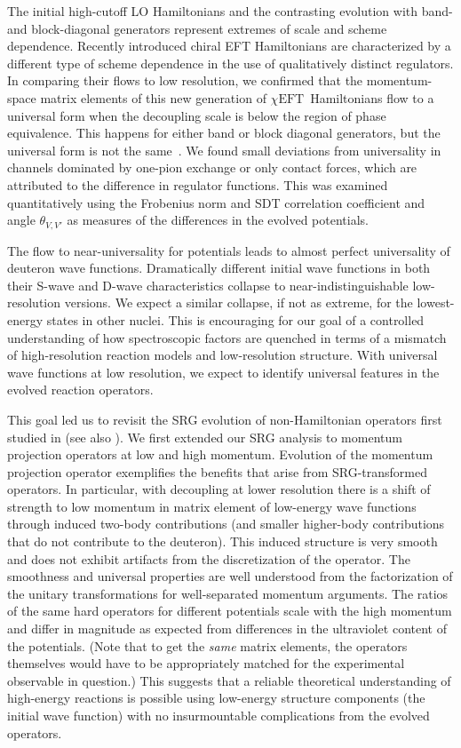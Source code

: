 \documentclass[10pt,aps,prc,floatfix,twocolumn,nofootinbib]{revtex4-1}
\newcommand{\chiEFT}{\ensuremath{\chi{\textrm{EFT}}}}
\begin{document}
The initial high-cutoff LO Hamiltonians and the contrasting evolution with band- and block-diagonal generators represent extremes of scale and scheme dependence.
Recently introduced chiral EFT Hamiltonians are characterized by a different type of scheme dependence in the use of qualitatively distinct regulators. 
In comparing their flows to low resolution, we confirmed that the momentum-space matrix elements of this new generation of \chiEFT\ Hamiltonians flow to a universal form when the decoupling scale is below the region of phase equivalence.
This happens for either band or block diagonal generators, but the universal form is not the same~\cite{Dainton:2013axa}.
We found small deviations from universality in channels dominated by one-pion exchange or only contact forces, which are attributed to the difference in regulator functions.
This was examined quantitatively using the Frobenius norm and SDT correlation coefficient and angle $\theta_{V,V'}$ as measures of the differences in the evolved potentials.


The flow to near-universality for potentials leads to almost perfect universality of deuteron wave functions.
Dramatically different initial wave functions in both their S-wave and D-wave characteristics collapse to near-indistinguishable low-resolution versions. 
We expect a similar collapse, if not as extreme, for the lowest-energy states in other nuclei.
This is encouraging for our goal of a controlled understanding of how spectroscopic factors are quenched in terms of a mismatch of high-resolution reaction models and low-resolution structure.
With universal wave functions at low resolution, we expect to identify universal features in the evolved reaction operators.


This goal led us to revisit the SRG evolution of non-Hamiltonian operators first studied in \cite{Anderson:2010aq,Bogner:2012zm} (see also \cite{Schuster:2013sda,Schuster:2014lga}).
We first extended our SRG analysis to momentum projection operators at low and high momentum.
Evolution of the momentum projection operator exemplifies the benefits that arise from SRG-transformed operators.
In particular, with decoupling at lower resolution there is a shift of strength to low momentum in matrix element of low-energy wave functions through induced two-body contributions (and smaller higher-body contributions that do not contribute to the deuteron).
This induced structure is very smooth and does not exhibit artifacts from the discretization of the operator.
The smoothness and universal properties are well understood from the factorization of the unitary transformations for well-separated momentum arguments.
The ratios of the same hard operators for different potentials scale with the high momentum and differ in magnitude as expected from differences in the ultraviolet content of the potentials.
(Note that to get the \emph{same} matrix elements, the operators themselves would have to be appropriately matched for the experimental observable in question.)
This suggests that a reliable theoretical understanding of high-energy reactions is possible using low-energy structure components (the initial wave function) with no insurmountable complications from the evolved operators.
\end{document}
